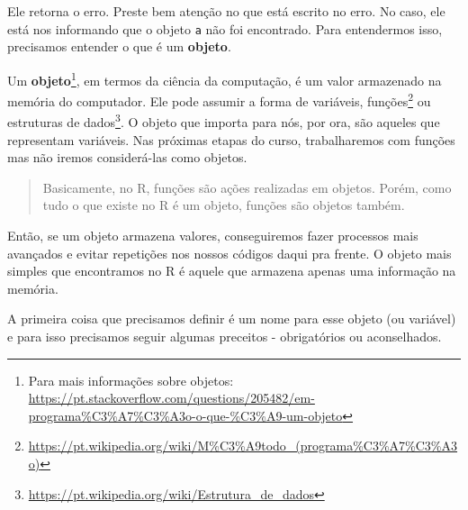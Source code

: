 \documentclass[]{book}
\let\rmarkdownfootnote\footnote%
\def\footnote{\protect\rmarkdownfootnote}
\theoremstyle{definition}
\theoremstyle{definition}
\theoremstyle{definition}
\theoremstyle{remark}
\begin{document}
Ele retorna o erro. Preste bem atenção no que está escrito no erro. No caso, ele está nos informando que o objeto \texttt{a} não foi encontrado. Para entendermos isso, precisamos entender o que é um \textbf{objeto}.

Um \textbf{objeto}\footnote{Para mais informações sobre objetos: \url{https://pt.stackoverflow.com/questions/205482/em-programa\%C3\%A7\%C3\%A3o-o-que-\%C3\%A9-um-objeto}}, em termos da ciência da computação, é um valor armazenado na memória do computador. Ele pode assumir a forma de variáveis, funções\footnote{\url{https://pt.wikipedia.org/wiki/M\%C3\%A9todo_(programa\%C3\%A7\%C3\%A3o)}} ou estruturas de dados\footnote{\url{https://pt.wikipedia.org/wiki/Estrutura_de_dados}}. O objeto que importa para nós, por ora, são aqueles que representam variáveis. Nas próximas etapas do curso, trabalharemos com funções mas não iremos considerá-las como objetos.

\begin{quote}
Basicamente, no R, funções são ações realizadas em objetos. Porém, como tudo o que existe no R é um objeto, funções são objetos também.
\end{quote}

Então, se um objeto armazena valores, conseguiremos fazer processos mais avançados e evitar repetições nos nossos códigos daqui pra frente. O objeto mais simples que encontramos no R é aquele que armazena apenas uma informação na memória.

A primeira coisa que precisamos definir é um nome para esse objeto (ou variável) e para isso precisamos seguir algumas preceitos - obrigatórios ou aconselhados.
\end{document}
